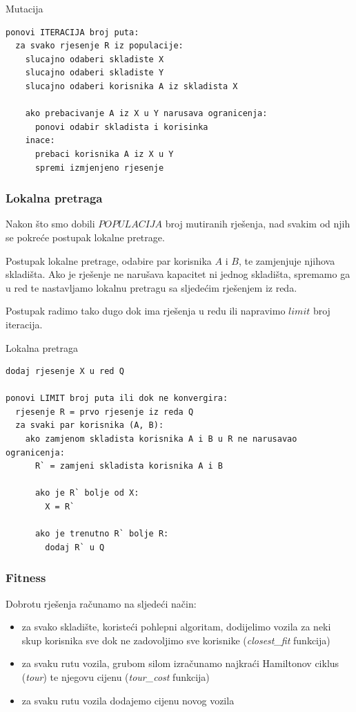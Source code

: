 \documentclass[utf8]{beamer}
\begin{document}
\begin{frame}[fragile]{Mutacija}
\begin{lstlisting}
ponovi ITERACIJA broj puta:
  za svako rjesenje R iz populacije:
    slucajno odaberi skladiste X
    slucajno odaberi skladiste Y
    slucajno odaberi korisnika A iz skladista X
		
    ako prebacivanje A iz X u Y narusava ogranicenja:
      ponovi odabir skladista i korisinka
    inace:
      prebaci korisnika A iz X u Y
      spremi izmjenjeno rjesenje
\end{lstlisting}
\end{frame}

\begin{frame}
\frametitle{Lokalna pretraga}

Nakon što smo dobili $POPULACIJA$ broj mutiranih rješenja, nad svakim od njih se pokreće postupak lokalne pretrage. 

\vspace{5mm}

Postupak lokalne pretrage, odabire par korisnika $A$ i $B$, te zamjenjuje njihova skladišta. Ako je rješenje ne narušava kapacitet ni jednog skladišta, spremamo ga u red te nastavljamo lokalnu pretragu sa sljedećim rješenjem iz reda.

\vspace{5mm}

Postupak radimo tako dugo dok ima rješenja u redu ili napravimo $limit$ broj iteracija.

\end{frame}

\begin{frame}[fragile]{Lokalna pretraga}
\begin{lstlisting}
dodaj rjesenje X u red Q

ponovi LIMIT broj puta ili dok ne konvergira:
  rjesenje R = prvo rjesenje iz reda Q
  za svaki par korisnika (A, B):
    ako zamjenom skladista korisnika A i B u R ne narusavao ogranicenja:
      R` = zamjeni skladista korisnika A i B
      
      ako je R` bolje od X:
        X = R`
      
      ako je trenutno R` bolje R:
        dodaj R` u Q
\end{lstlisting}
\end{frame}

\begin{frame}
\frametitle{Fitness}
Dobrotu rješenja računamo na sljedeći način:
\begin{itemize}
	\item za svako skladište, koristeći pohlepni algoritam, dodijelimo vozila za neki skup korisnika sve dok ne zadovoljimo sve korisnike (\textit{closest\_fit} funkcija)
	
	\item za svaku rutu vozila, grubom silom izračunamo najkraći Hamiltonov ciklus (\textit{tour}) te njegovu cijenu (\textit{tour\_cost} funkcija)
	
	\item za svaku rutu vozila dodajemo cijenu novog vozila
\end{itemize}
\end{frame}
\end{document}
